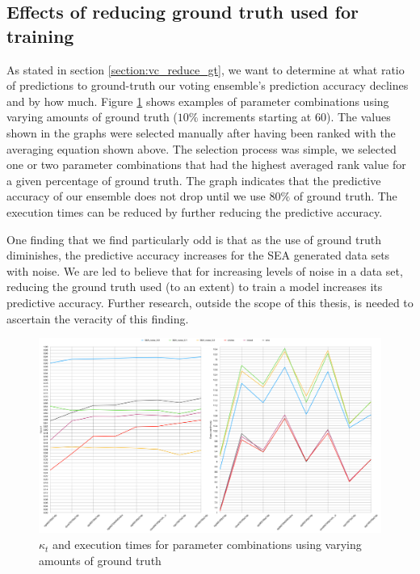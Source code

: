 \subsection{Effects of reducing ground truth used for training}
As stated in section \ref{section:vc_reduce_gt}, we want to determine at what ratio of predictions to ground-truth our voting ensemble's prediction accuracy declines and by how much. Figure \ref{fig:ground_truth_drop} shows examples of parameter combinations using varying amounts of ground truth ($10\%$ increments starting at 60). The values shown in the graphs were selected manually after having been ranked with the averaging equation shown above. The selection process was simple, we selected one or two parameter combinations that had the highest averaged rank value for a given percentage of ground truth. The graph indicates that the predictive accuracy of our ensemble does not drop until we use $80\%$ of ground truth. The execution times can be reduced by further reducing the predictive accuracy.

One finding that we find particularly odd is that as the use of ground truth diminishes, the predictive accuracy increases for the SEA generated data sets with noise. We are led to believe that for increasing levels of noise in a data set, reducing the ground truth used (to an extent) to train a model increases its predictive accuracy. Further research, outside the scope of this thesis, is needed to ascertain the veracity of this finding.

\begin{figure}
  \includegraphics[width=\linewidth]{./images/chapter5/ground_truth_both}
\caption{\label{fig:ground_truth_drop}$\kappa_t$ and execution times for parameter combinations using varying amounts of ground truth}
\end{figure}

